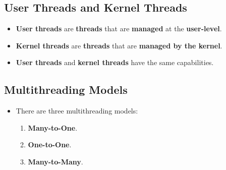\documentclass{article}
\begin{document}
\subsection*{User Threads and Kernel Threads}
\begin{itemize}
    \item \textbf{User threads} are \textbf{threads} that are \textbf{managed} at the \textbf{user-level}.
    \item \textbf{Kernel threads} are \textbf{threads} that are \textbf{managed by the kernel}.
    \item \textbf{User threads} and \textbf{kernel threads} have the same capabilities. 
\end{itemize}

\subsection*{Multithreading Models}
\begin{itemize}
    \item There are three multithreading models:
    \begin{enumerate}
        \item \textbf{Many-to-One}.
        \item \textbf{One-to-One}.
        \item \textbf{Many-to-Many}.
    \end{enumerate}
\end{itemize}
\end{document}
